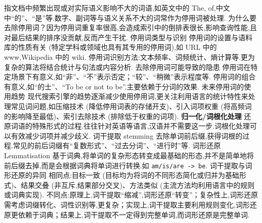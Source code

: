 \documentclass[10pt, utf8]{ctexart}
\begin{document}
\begin{multicols}{4}
    指文档中频繁出现或对实际语义影响不大的词语,如英文中的 The, of,中文中“的”、“是”等.数字、副词等与语义关系不大的词常作为停用词被处理.
    为什么要去除停用词？因为停用词重复率很高,会造成索引中的倒排表很长,影响查询性能,且对最后结果的排序没贡献,反而产生干扰.
    {\color{blue}停用词类型与识别}
    停用词的设置与语料库的性质有关 (特定学科或领域也具有其专用的停用词),如 URL 中的 www,Wikipedia 中的 wiki.
    停用词识别方法:文本频率、词频统计、熵计算等.更为复杂的算法将结合统计与句法或内容分析.
    {\color{blue}去除停用词可能导致的隐患}
    停用词在特定场景下有意义,如“非”、“不”表示否定；“较”、“稍微”表示程度等.
    停用词的组合有意义,如“的士”、“To be or not to be”.主要依赖于分词的效果.
    {\color{blue}未来停用词的使用趋势}
    现代搜索引擎的趋势逐渐减少使用停用词,更关注利用语言的统计特性来处理常见词问题,如压缩技术 (降低停用词表的存储开支)、引入词项权重 (将高频词的影响降至最低)、索引去除技术 (排除低于权重的词项).
        {\color{purple_}\textbf{归一化/词根化处理}}
    还原词语的特殊形式的过程.往往针对英语等语言,汉语并不需要这一步.词根化处理可以有效减少词项并减少歧义.
    {\color{blue}词干提取 stemming}
    去除单词前后缀,获得词根的过程.常见的前后词缀有“复数形式”、“过去分词”、“进行时”等.
    {\color{blue}词形还原 Lemmatisation}
    基于词典,将单词的复杂形态转变成最基础的形态,并不是简单地将前后缀去掉,而是会根据词典将单词进行转换.如 \verb|am/is/are -> be|.
    {\color{blue}词干提取与词形还原的异同}
    相同点:目标一致 (目标均为将词的不同形态简化或归并为基础形式)、结果交叠 (非互斥,结果部分交叉)、方法类似 (主流方法均利用语言中的规则或词典实现).
    不同点:原理上,词干提取“缩减”,词形还原“转变”；复杂性上,词形还原需考虑词缀转化、词性识别等,更复杂；实现上,词干提取主要利用规则变化,词形还原更依赖于词典；结果上,词干提取不一定得到完整单词,而词形还原是完整单词.


\end{multicols}
\end{document}
